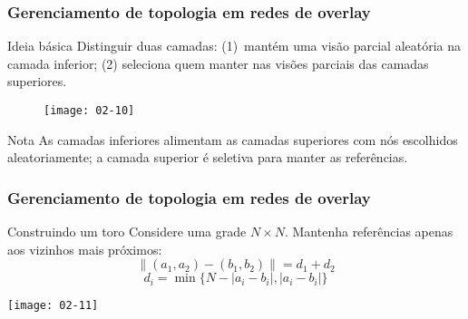 \documentclass[Ligatures=TeX,table,brazil,svgnames,usetotalslideindicator,compress,10pt]{beamer}
\begin{document}
\begin{frame}
  \frametitle{Gerenciamento de topologia em redes de overlay}
  \begin{block}{Ideia básica}
    Distinguir duas camadas: (1)~mantém uma visão parcial aleatória na camada inferior; (2) seleciona quem manter nas visões parciais das camadas superiores.
  \end{block}

  \begin{figure}
    \centering
    \texttt{[image: 02-10]}
  \end{figure}

  \vspace{-0.5em}
  \begin{alertblock}{Nota}
    As camadas inferiores \alert{alimentam} as camadas superiores com nós escolhidos aleatoriamente; a camada superior é \alert{seletiva} para manter as referências.
  \end{alertblock}

\end{frame}

\begin{frame}
  \frametitle{Gerenciamento de topologia em redes de overlay}

  \begin{exampleblock}{Construindo um toro}
    Considere uma grade $N \times N$. Mantenha referências apenas aos \alert{vizinhos mais próximos}:
    \[\parallel (a_1,a_2) - (b_1,b_2) \parallel = d_1 + d_2\]
    \[d_i = \min\{N - |a_i - b_i|, |a_i - b_i|\}\]
  \end{exampleblock}

  \texttt{[image: 02-11]}
\end{frame}

\end{document}
